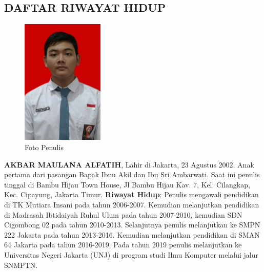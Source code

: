 \begin{spacing}{1.5}
    \chapter {DAFTAR RIWAYAT HIDUP}
\begin{figure}[H]
	\centering
	\includegraphics[width=0.35\textwidth]{gambar/me2.jpeg}
	\caption{Foto Penulis}
	\label{fig:bio-Akbar}
\end{figure}
\begin{flushleft}
\textbf{AKBAR MAULANA ALFATIH}, Lahir di Jakarta, 23 Agustus 2002. Anak pertama dari pasangan Bapak Ibnu Akil dan Ibu Sri Ambarwati. Saat ini penulis tinggal di Bambu Hijau Town House, Jl Bambu Hijau Kav. 7, Kel. Cilangkap, Kec. Cipayung, Jakarta Timur.
\linebreak
\textbf{Riwayat Hidup}: Penulis mengawali pendidikan di TK Mutiara Insani pada tahun 2006-2007. Kemudian melanjutkan pendidikan di Madrasah Ibtidaiyah Ruhul Ulum pada tahun 2007-2010, kemudian SDN Cigombong 02 pada tahun 2010-2013. Selanjutnya penulis melanjutkan ke SMPN 222 Jakarta pada tahun 2013-2016. Kemudian melanjutkan pendidikan di SMAN 64 Jakarta pada tahun 2016-2019. Pada tahun 2019 penulis melanjutkan ke Universitas Negeri Jakarta (UNJ) di program studi Ilmu Komputer melalui jalur SNMPTN.
\end{flushleft}
\end{spacing}